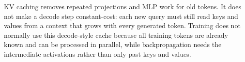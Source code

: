 KV caching removes repeated projections and MLP work for old tokens. It does not make a
decode step constant-cost: each new query must still read keys and values from a context
that grows with every generated token. Training does not normally use this decode-style
cache because all training tokens are already known and can be processed in parallel,
while backpropagation needs the intermediate activations rather than only past keys and
values.
